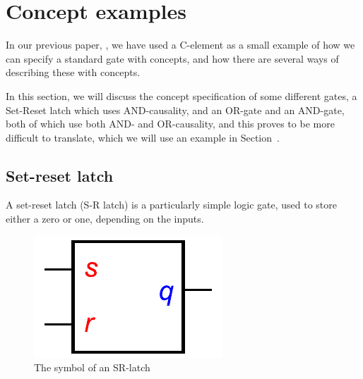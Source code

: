 \documentclass[british,conference,compsoc]{IEEEtran}
\begin{document}

\section{Concept examples \label{sec:examples}}

In our previous paper, \cite{2015_Beaumont_MEMOCODE}, we have 
used a C-element as a small example of how we can specify a standard gate with concepts,
and how there are several ways of describing these with concepts. 

In this section, we will discuss the concept specification of some different gates,
a Set-Reset latch which uses AND-causality, and an OR-gate and an AND-gate, both of 
which use both AND- and OR-causality, and this proves to be more difficult to translate,
which we will use an example in Section~\label{translation-algorithm}.


\subsection{Set-reset latch \label{sub:srlatch}}

A set-reset latch (S-R latch) is a particularly simple logic gate, used to store either a zero or one,
depending on the inputs. 


\begin{figure}[h]
\begin{centering}
\includegraphics[scale=0.51]{Images/sr-latch-circuit}
\par\end{centering}
\protect\caption{\label{fig:sr-latch-circuit} The symbol of an SR-latch}
\end{figure}
\end{document}

